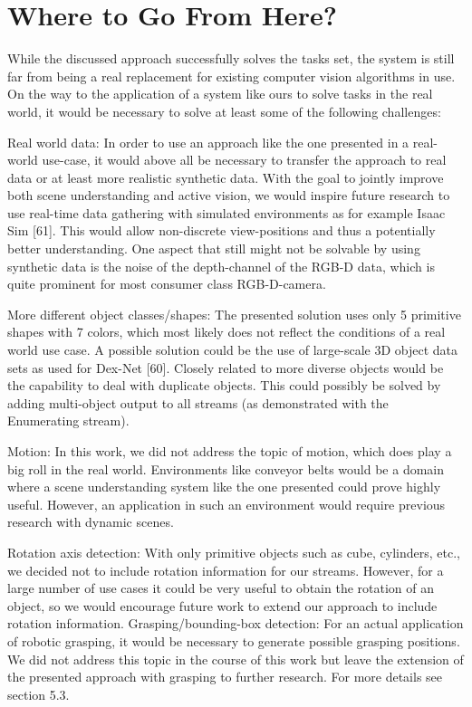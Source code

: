 \section{Where to Go From Here?}
While the discussed approach successfully solves the tasks set, the system is still far from being a real
replacement for existing computer vision algorithms in use. On the way to the application of a system
like ours to solve tasks in the real world, it would be necessary to solve at least some of the following
challenges:

Real world data: In order to use an approach like the one presented in a real-world use-case, it would
above all be necessary to transfer the approach to real data or at least more realistic synthetic data.
With the goal to jointly improve both scene understanding and active vision, we would inspire future
research to use real-time data gathering with simulated environments as for example Isaac Sim [61].
This would allow non-discrete view-positions and thus a potentially better understanding. One aspect
that still might not be solvable by using synthetic data is the noise of the depth-channel of the RGB-D
data, which is quite prominent for most consumer class RGB-D-camera.

More diﬀerent object classes/shapes: The presented solution uses only 5 primitive shapes with 7
colors, which most likely does not reﬂect the conditions of a real world use case. A possible solution
could be the use of large-scale 3D object data sets as used for Dex-Net [60]. Closely related to more
diverse objects would be the capability to deal with duplicate objects. This could possibly be solved by
adding multi-object output to all streams (as demonstrated with the Enumerating stream).

Motion: In this work, we did not address the topic of motion, which does play a big roll in the real
world. Environments like conveyor belts would be a domain where a scene understanding system like
the one presented could prove highly useful. However, an application in such an environment would
require previous research with dynamic scenes.

Rotation axis detection: With only primitive objects such as cube, cylinders, etc., we decided not to
include rotation information for our streams. However, for a large number of use cases it could be very
useful to obtain the rotation of an object, so we would encourage future work to extend our approach
to include rotation information.
Grasping/bounding-box detection: For an actual application of robotic grasping, it would be necessary
to generate possible grasping positions. We did not address this topic in the course of this work
but leave the extension of the presented approach with grasping to further research. For more details
see section 5.3.


